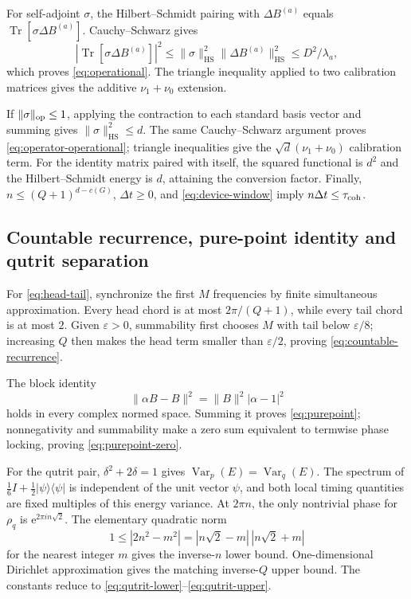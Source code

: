 \documentclass[10pt]{article}
\theoremstyle{definition}
\newcommand{\HS}{\mathrm{HS}}
\newcommand{\ee}{\mathrm e}
\begin{document}
For self-adjoint \(\sigma\), the Hilbert--Schmidt pairing with
\(\Delta B^{(a)}\) equals
\(\operatorname{Tr}[\sigma\Delta B^{(a)}]\).  Cauchy--Schwarz gives
\[
 |\operatorname{Tr}[\sigma\Delta B^{(a)}]|^2
 \leq\|\sigma\|_{\HS}^2\|\Delta B^{(a)}\|_{\HS}^2
 \leq D^2/\lambda_a,
\]
which proves \eqref{eq:operational}.  The triangle inequality applied to two
calibration matrices gives the additive \(\nu_1+\nu_0\) extension.

If \(\|\sigma\|_{\rm op}\leq1\), applying the contraction to each standard
basis vector and summing gives
\(\|\sigma\|_{\HS}^2\leq d\).  The same Cauchy--Schwarz argument proves
\eqref{eq:operator-operational}; triangle inequalities give the
\(\sqrt d(\nu_1+\nu_0)\) calibration term.  For the identity matrix paired
with itself, the squared functional is \(d^2\) and the Hilbert--Schmidt
energy is \(d\), attaining the conversion factor.  Finally,
\(n\leq(Q+1)^{d-c(G)}\), \(\Delta t\geq0\), and
\eqref{eq:device-window} imply \(n\Delta t\leq\tau_{\rm coh}\).

\subsection*{Countable recurrence, pure-point identity and qutrit separation}

For \eqref{eq:head-tail}, synchronize the first \(M\) frequencies by finite
simultaneous approximation.  Every head chord is at most
\(2\pi/(Q+1)\), while every tail chord is at most \(2\).  Given
\(\varepsilon>0\), summability first chooses \(M\) with tail below
\(\varepsilon/8\); increasing \(Q\) then makes the head term smaller than
\(\varepsilon/2\), proving \eqref{eq:countable-recurrence}.

The block identity
\[
 \|\alpha B-B\|^2=\|B\|^2|\alpha-1|^2
\]
holds in every complex normed space.  Summing it proves
\eqref{eq:purepoint}; nonnegativity and summability make a zero sum
equivalent to termwise phase locking, proving \eqref{eq:purepoint-zero}.

For the qutrit pair, \(\delta^2+2\delta=1\) gives
\(\operatorname{Var}_p(E)=\operatorname{Var}_q(E)\).  The spectrum of
\(\frac16I+\frac12|\psi\rangle\langle\psi|\) is independent of the unit
vector \(\psi\), and both local timing quantities are fixed multiples of
this energy variance.  At \(2\pi n\), the only nontrivial phase for
\(\rho_q\) is \(\ee^{2\pi in\sqrt2}\).  The elementary quadratic norm
\[
 1\leq|2n^2-m^2|
 =|n\sqrt2-m|\,|n\sqrt2+m|
\]
for the nearest integer \(m\) gives the inverse-\(n\) lower bound.
One-dimensional Dirichlet approximation gives the matching
inverse-\(Q\) upper bound.  The constants reduce to
\eqref{eq:qutrit-lower}--\eqref{eq:qutrit-upper}.
\end{document}

